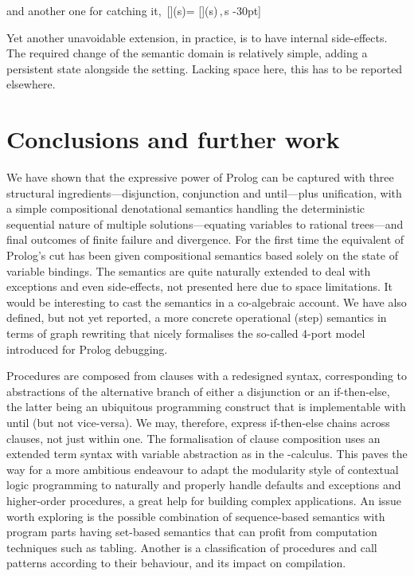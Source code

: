 \documentclass{tlp}
\def\denotstart{[\![\,}
\def\denotend{\,]\!]}
\def\denot#1{\denotstart#1\denotend}
\def\munt{\textsf{until}}
\def\mite{\textsf{if-then-else}}
\def\mtt#1{\mbox{\tt #1}}
\def\catch#1#2{#1\,\langle #2\rangle\,s}
\begin{document}
and another one for catching it,\
\denot{\mtt{catch}(\mathit{task},,)}(s)=
\catch{\denot{\mathit{task}}(s)}{\mathit{exc},\mathit{handler}}
-30pt]


Yet another unavoidable extension, in practice, is to have internal
side-effects. The required change of the semantic domain is relatively
simple, adding a persistent state alongside the setting. Lacking space here, this has to be
reported elsewhere.

\section{Conclusions and further work}

We have shown that the expressive power of Prolog can be captured with three
structural ingredients---disjunction, conjunction and \munt---plus unification,
with a simple compositional denotational semantics handling the deterministic
sequential nature of multiple solutions---equating variables to rational
trees---and final outcomes of finite failure and divergence. For the first time
the equivalent of Prolog's cut has been given compositional semantics based
solely on the state of variable bindings.  The semantics are quite naturally
extended to deal with exceptions and even side-effects, not presented here due to
space limitations.  It would be interesting to cast the semantics in a
co-algebraic account. We have also defined, but not yet reported, a more concrete
operational (step) semantics in terms of graph rewriting that nicely formalises
the so-called 4-port model introduced for Prolog debugging.

Procedures are composed from clauses with a redesigned syntax, corresponding to
abstractions of the alternative branch of either a disjunction or an \mite, the
latter being an ubiquitous programming construct that is implementable with
\munt{} (but not vice-versa). We may, therefore, express \mite{} chains across clauses, not
just within one. The formalisation of clause composition uses an extended term
syntax with variable abstraction as in the -calculus. This paves the way
for a more ambitious endeavour to adapt the modularity style of contextual logic
programming \cite{mo_po:89:clp} to naturally and properly handle defaults and
exceptions and higher-order procedures, a great help for building complex
applications.  An issue worth exploring is the possible combination of
sequence-based semantics with program parts having set-based semantics that can
profit from computation techniques such as tabling. Another is a classification
of procedures and call patterns according to their behaviour, and its impact on
compilation.
\end{document}
